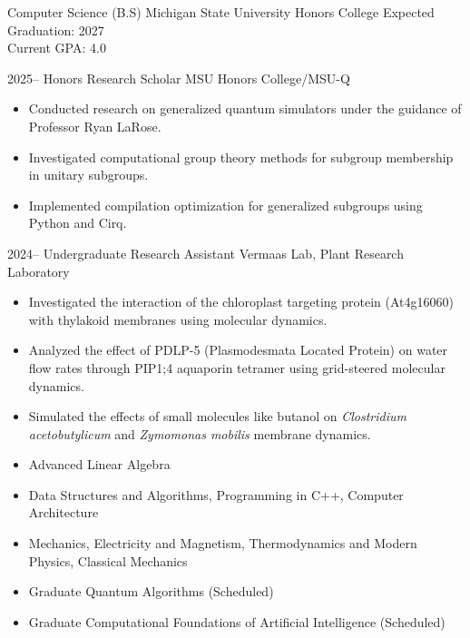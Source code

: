 \documentclass[9pt]{developercv} %
\begin{document}
\vspace{-10 pt}
\begin{entrylist}
    \entry
		{\hspace{10pt}}
		{Computer Science (B.S)}
		{Michigan State University Honors College}
		{Expected Graduation: 2027 \\ 
		Current GPA: 4.0}
\end{entrylist}
\vspace{-10pt}
\begin{entrylist}
	\entry
	{2025--}
	{Honors Research Scholar}
	{MSU Honors College/MSU-Q}
	{\vspace{-10pt}
	\begin{itemize}[noitemsep,topsep=0pt,parsep=0pt,partopsep=0pt, leftmargin=7pt]
	\item Conducted research on generalized quantum simulators under the guidance of Professor Ryan LaRose.
	\item Investigated computational group theory methods for subgroup membership in unitary subgroups.
	\item Implemented compilation optimization for generalized subgroups using Python and Cirq.
	\end{itemize}
	}
	\entry 
		{2024--}
		{Undergraduate Research Assistant}
		{Vermaas Lab, Plant Research Laboratory}
		{\vspace{-10pt}
		\begin{itemize}[noitemsep,topsep=0pt,parsep=0pt,partopsep=0pt, leftmargin=7pt]
			\item Investigated the interaction of the chloroplast targeting protein (At4g16060) with thylakoid membranes using molecular dynamics.
			\item Analyzed the effect of PDLP-5 (Plasmodesmata Located Protein) on water flow rates through PIP1;4 aquaporin tetramer using grid-steered molecular dynamics.
			\item Simulated the effects of small molecules like butanol on \textit{Clostridium acetobutylicum} and \textit{Zymomonas mobilis} membrane dynamics. 
		\end{itemize}
		}
\end{entrylist}
\vspace{-8pt}
\begin{itemize}
	\item Advanced Linear Algebra
	\item Data Structures and Algorithms, Programming in C++, Computer Architecture 
	\item Mechanics, Electricity and Magnetism, Thermodynamics and Modern Physics, Classical Mechanics
	\item Graduate Quantum Algorithms (Scheduled)
	\item Graduate Computational Foundations of Artificial Intelligence (Scheduled)
\end{itemize}
\end{document}
